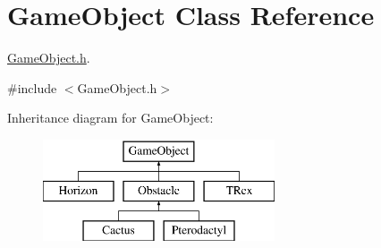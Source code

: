 \hypertarget{class_game_object}{}\section{Game\+Object Class Reference}
\label{class_game_object}


\mbox{\hyperlink{_game_object_8h}{Game\+Object.\+h}}.  




{\ttfamily \#include $<$Game\+Object.\+h$>$}

Inheritance diagram for Game\+Object\+:\begin{figure}[H]
\begin{center}
\leavevmode
\includegraphics[height=3.000000cm]{class_game_object}
\end{center}
\end{figure}
